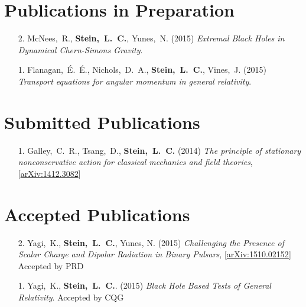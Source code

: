 \newcommand{\arxiv}[1]{[\href{http://arxiv.org/abs/#1}{arXiv:#1}]}

\section{\sc Publications in Preparation}
\begin{enumerate}
\item[{2.}]
  McNees,~R., {\bf Stein,~L.~C.}, Yunes,~N.
  (2015)
  {\it Extremal Black Holes in Dynamical Chern-Simons Gravity}.
\item[{1.}]
  Flanagan,~\'E.~\'E., Nichols,~D.~A., {\bf Stein,~L.~C.},
  Vines,~J.
  (2015)
  {\it Transport equations for angular momentum in general
    relativity}.
\end{enumerate}

\section{\sc Submitted Publications}
\begin{enumerate}
\item[{1.}] Galley,~C.~R., Tsang,~D., {\bf Stein,~L.~C.} (2014)
  {\it The principle of stationary nonconservative action for
    classical mechanics and field theories},
  \arxiv{1412.3082}
\end{enumerate}

\section{\sc Accepted Publications}
\begin{enumerate}
\item[{2.}] Yagi,~K., {\bf Stein,~L.~C.}, Yunes, N. (2015)
  {\it Challenging the Presence of Scalar Charge and Dipolar Radiation in Binary Pulsars},
  \arxiv{1510.02152}
  Accepted by PRD
\item[{1.}] Yagi,~K., {\bf Stein,~L.~C.}. (2015)
  {\it Black Hole Based Tests of General Relativity}.
  Accepted by CQG
\end{enumerate}

